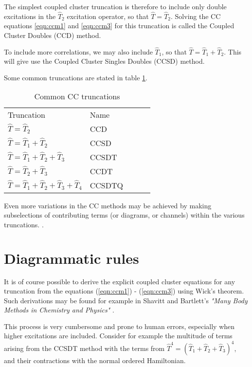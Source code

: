 The simplest coupled cluster truncation is therefore to include only double excitations in the $\hat{T}_2$ excitation operator, so that $\hat{T} = \hat{T}_2$. Solving the CC equations \ref{eqn:ccm1} and \ref{eqn:ccm3} for this truncation is called the Coupled Cluster Doubles (CCD) method.

To include more correlations, we may also include $\hat{T}_1$, so that $\hat{T} = \hat{T}_1 + \hat{T}_2$. This will give use the Coupled Cluster Singles Doubles (CCSD) method. 

Some common truncations are stated in table \ref{tab:cctrunc}.

\begin{table}[]
\centering
\caption{Common CC truncations}
\label{tab:cctrunc}
\begin{tabular}{lllll}
Truncation & Name & \\
$\hat{T} = \hat{T}_2$           & CCD   &  \\
$\hat{T} = \hat{T}_1 + \hat{T}_2$          & CCSD  &  \\
$\hat{T} = \hat{T}_1 + \hat{T}_2 +\hat{T}_3$           & CCSDT     &  \\
$\hat{T} = \hat{T}_2 + \hat{T}_3$           & CCDT     &   \\
$\hat{T} = \hat{T}_1 + \hat{T}_2 +  \hat{T}_3 + \hat{T}_4$           & CCSDTQ    &   \\
\end{tabular}
\end{table}

Even more variations in the CC methods may be achieved by making subselections of contributing terms (or diagrams, or channels) within the various truncations. \cite{Shepherd2013}. 


\section{Diagrammatic rules}

It is of course possible to derive the explicit coupled cluster equations for any truncation from the equations (\ref{eqn:ccm1}) - (\ref{eqn:ccm3}) using Wick's theorem. Such derivations may be found for example in Shavitt and Bartlett's \emph{"Many Body Methods in Chemistry and Physics"}  \cite[Chapter 9]{ShavittBartlett2009}.

This process is very cumbersome and prone to human errors, especially when higher excitations are included. Consider for example the multitude of terms arising from the CCSDT method with the terms from $\hat{T}^4 = (\hat{T}_1 + \hat{T}_2 + \hat{T}_3)^4$, and their contractions with the normal ordered Hamiltonian. 

